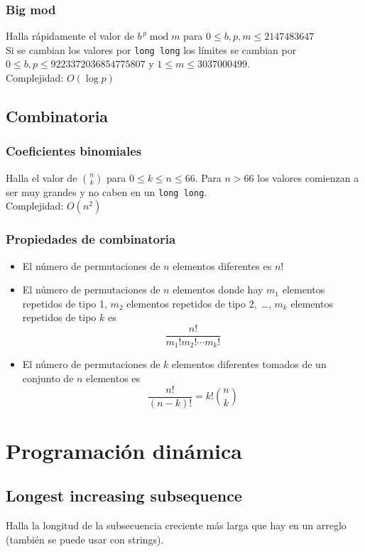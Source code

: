 \documentclass[10pt,letterpaper,twocolumn]{article}
\newcommand{\source}[1]{
	
	\dotfill
}
\begin{document}
		\subsubsection{Big mod}
		Halla rápidamente el valor de $b^{\,p} \operatorname{mod} m$ para $0 \leq b,p,m \leq 2147483647$\\
		Si se cambian los valores por \verb|long long| los límites se cambian por $0 \leq b,p \leq 9223372036854775807$ y $1 \leq m \leq 3037000499$.\\ 
		Complejidad: $O(\operatorname{log} p)$\\
		\source{./src/bigmod.cpp}
	
	\subsection{Combinatoria}
		\subsubsection{Coeficientes binomiales}
		Halla el valor de $\binom{n}{k}$ para $0 \leq k \leq n \leq 66$. Para $n > 66$ los valores comienzan a ser muy grandes y no caben en un \verb|long long|.\\
		Complejidad: $O(n^2)$\\
		\source{./src/binomial.cpp}
		
		\subsubsection{Propiedades de combinatoria}
		\begin{itemize}
			\item El número de permutaciones de $n$ elementos diferentes es $n!$
			\item El número de permutaciones de $n$ elementos donde hay $m_1$ elementos repetidos de tipo 1, $m_2$ elementos repetidos de tipo 2,~\ldots, $m_k$ elementos repetidos de tipo $k$ es $$\frac{n!}{m_1! m_2! \cdots m_k!} $$
			\item El número de permutaciones de $k$ elementos diferentes tomados de un conjunto de $n$ elementos es $$ \frac{n!}{(n-k)!} = k! \binom{n}{k}$$
		\end{itemize}
		
		
	
\section{Programación dinámica}
	\subsection{Longest increasing subsequence}
		Halla la longitud de la subsecuencia creciente más larga que hay en un arreglo (también se puede usar con strings).
\end{document}
